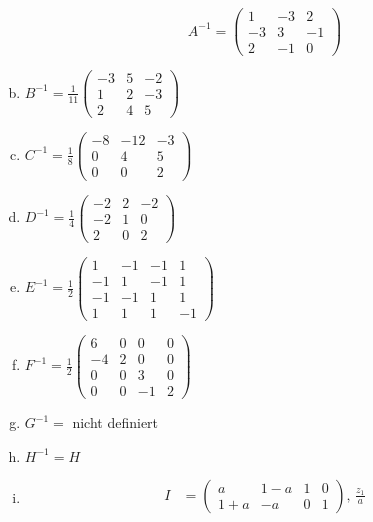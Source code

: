\documentclass{standalone}
\begin{document}
\begin{enumerate}[a)]
    $$ A^{-1}=\begin{pmatrix}
        1 & -3 & 2 \\
        -3 & 3 & -1 \\
        2 & -1 & 0
    \end{pmatrix} $$
    \item $B^{-1} = \frac{1}{11} \begin{pmatrix}
        -3 & 5 & -2 \\
        1 & 2 & -3 \\
        2 & 4 & 5
    \end{pmatrix}$
    \item $C^{-1} = \frac{1}{8} \begin{pmatrix}
        -8 & -12 & -3 \\
        0 & 4 & 5 \\
        0 & 0 & 2
    \end{pmatrix}$
    \item $D^{-1} = \frac{1}{4} \begin{pmatrix}
        -2 & 2 & -2 \\
        -2 & 1 & 0 \\
        2 & 0 & 2
    \end{pmatrix}$
    \item $E^{-1} = \frac{1}{2} \begin{pmatrix}
        1 & -1 & -1 & 1 \\
        -1 & 1 & -1 & 1 \\
        -1 & -1 & 1 & 1 \\
        1 & 1 & 1 & -1
    \end{pmatrix}$
    \item $F^{-1} = \frac{1}{2} \begin{pmatrix}
        6 & 0 & 0 & 0 \\
        -4 & 2 & 0 & 0 \\
        0 & 0 & 3 & 0 \\
        0 & 0 & -1 & 2
    \end{pmatrix}$
    \item $G^{-1} =$ nicht definiert
    \item $H^{-1} = H$
    \item \begin{align}
        I &= \left( \begin{array}{cc|cc}
            a & 1-a & 1 & 0 \\
            1+a & -a & 0 & 1
        \end{array} \right) \text{, } \frac{z_1}{a} \\

\end{align}
\end{enumerate}
\end{document}
